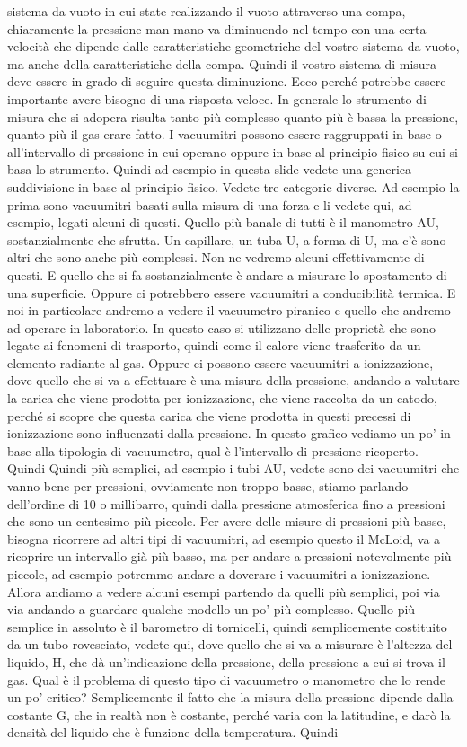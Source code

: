sistema da vuoto in cui state realizzando il vuoto attraverso una compa, chiaramente la pressione man mano va diminuendo nel tempo con una certa velocità che dipende dalle caratteristiche geometriche del vostro sistema da vuoto, ma anche della caratteristiche della compa. Quindi il vostro sistema di misura deve essere in grado di seguire questa diminuzione. Ecco perché potrebbe essere importante avere bisogno di una risposta veloce. In generale lo strumento di misura che si adopera risulta tanto più complesso quanto più è bassa la pressione, quanto più il gas erare fatto. I vacuumitri possono essere raggruppati in base o all'intervallo di pressione in cui operano oppure in base al principio fisico su cui si basa lo strumento. Quindi ad esempio in questa slide vedete una generica suddivisione in base al principio fisico. Vedete tre categorie diverse. Ad esempio la prima sono vacuumitri basati sulla misura di una forza e li vedete qui, ad esempio, legati alcuni di questi. Quello più banale di tutti è il manometro AU, sostanzialmente che sfrutta. Un capillare, un tuba U, a forma di U, ma c'è sono altri che sono anche più complessi. Non ne vedremo alcuni effettivamente di questi. E quello che si fa sostanzialmente è andare a misurare lo spostamento di una superficie. Oppure ci potrebbero essere vacuumitri a conducibilità termica. E noi in particolare andremo a vedere il vacuumetro piranico e quello che andremo ad operare in laboratorio. In questo caso si utilizzano delle proprietà che sono legate ai fenomeni di trasporto, quindi come il calore viene trasferito da un elemento radiante al gas. Oppure ci possono essere vacuumitri a ionizzazione, dove quello che si va a effettuare è una misura della pressione, andando a valutare la carica che viene prodotta per ionizzazione, che viene raccolta da un catodo, perché si scopre che questa carica che viene prodotta in questi precessi di ionizzazione sono influenzati dalla pressione. In questo grafico vediamo un po' in base alla tipologia di vacuumetro, qual è l'intervallo di pressione ricoperto. Quindi Quindi più semplici, ad esempio i tubi AU, vedete sono dei vacuumitri che vanno bene per pressioni, ovviamente non troppo basse, stiamo parlando dell'ordine di 10 o millibarro, quindi dalla pressione atmosferica fino a pressioni che sono un centesimo più piccole. Per avere delle misure di pressioni più basse, bisogna ricorrere ad altri tipi di vacuumitri, ad esempio questo il McLoid, va a ricoprire un intervallo già più basso, ma per andare a pressioni notevolmente più piccole, ad esempio potremmo andare a doverare i vacuumitri a ionizzazione. Allora andiamo a vedere alcuni esempi partendo da quelli più semplici, poi via via andando a guardare qualche modello un po' più complesso. Quello più semplice in assoluto è il barometro di tornicelli, quindi semplicemente costituito da un tubo rovesciato, vedete qui, dove quello che si va a misurare è l'altezza del liquido, H, che dà un'indicazione della pressione, della pressione a cui si trova il gas. Qual è il problema di questo tipo di vacuumetro o manometro che lo rende un po' critico? Semplicemente il fatto che la misura della pressione dipende dalla costante G, che in realtà non è costante, perché varia con la latitudine, e darò la densità del liquido che è funzione della temperatura. Quindi 